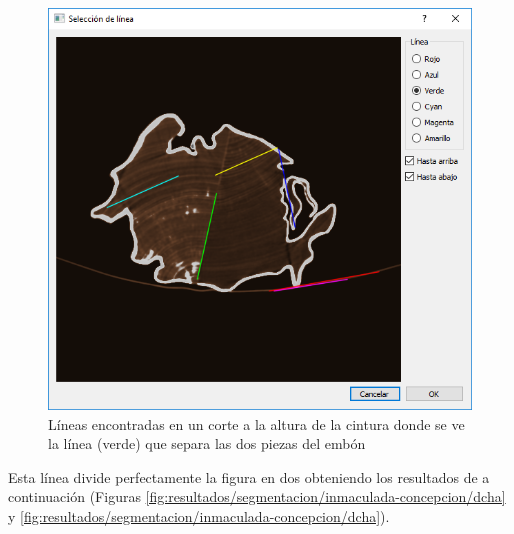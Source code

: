 \begin{figure}[H]
	\centering
	\includegraphics[width=12cm]{imagenes/resultados/segmentacion/inmaculada-concepcion/seleccion-linea}
	\caption{Líneas encontradas en un corte a la altura de la cintura donde se ve la línea (verde) que separa las dos piezas del embón}
	\label{fig:resultados/segmentacion/inmaculada-concepcion/seleccion-linea}
\end{figure}

Esta línea divide perfectamente la figura en dos obteniendo los resultados de a continuación (Figuras \ref{fig:resultados/segmentacion/inmaculada-concepcion/dcha} y \ref{fig:resultados/segmentacion/inmaculada-concepcion/dcha}).

